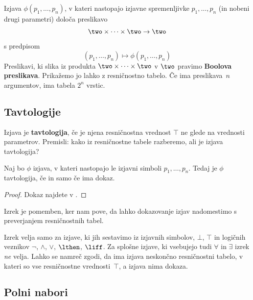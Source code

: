 Izjava $\phi(p_1, \ldots, p_n)$, v kateri nastopajo izjavne spremenljivke $p_1, \ldots, p_n$ (in nobeni drugi parametri) določa preslikavo
%
\begin{equation*}
  \two \times \cdots \times \two \to \two
\end{equation*}
%
s predpisom
%
\begin{equation*}
    (p_1, \ldots, p_n) \mapsto \phi(p_1, \ldots, p_n)
\end{equation*}
%
Preslikavi, ki slika iz produkta $\two \times \cdots \times \two$ v $\two$ pravimo \textbf{Boolova preslikava}. Prikažemo jo lahko z resničnostno tabelo. Če ima preslikava~$n$ argumentov, ima tabela $2^n$ vrstic.


\subsection{Tavtologije}

Izjava je \textbf{tavtologija}, če je njena resničnostna vrednost $\top$ ne glede na
vrednosti parametrov. Premisli: kako iz resničnostne tabele razberemo, ali je
izjava tavtologija?

\begin{izrek}
  Naj bo $\phi$ izjava, v kateri nastopajo le izjavni simboli
  $p_1,\ldots,p_n$. Tedaj je $\phi$ tavtologija, če in samo če ima dokaz.
\end{izrek}

\begin{proof}
  Dokaz najdete v \cite{prijatelj92:_osnov}.
\end{proof}

\noindent
%
Izrek je pomemben, ker nam pove, da lahko dokazovanje izjav nadomestimo s preverjanjem resničnostnih tabel.

\begin{opomba}
  Izrek velja samo za izjave, ki jih sestavimo iz izjavnih simbolov, $\bot$, $\top$ in
  logičnih veznikov $\neg$, $\land$, $\lor$, $\lthen$, $\liff$. Za splošne izjave, ki vsebujejo tudi $\forall$ in $\exists$ izrek \emph{ne} velja. Lahko se namreč zgodi, da ima izjava neskončno resničnostni tabelo, v kateri so vse resničnostne vrednosti~$\top$, a izjava nima dokaza.
\end{opomba}

\subsection{Polni nabori}


